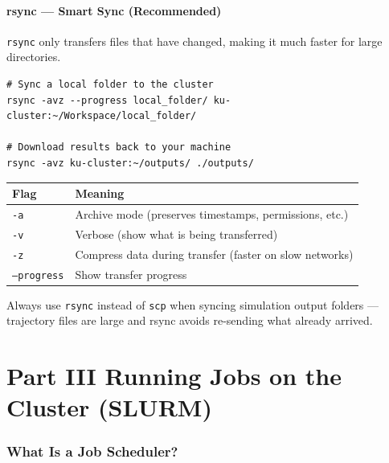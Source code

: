 \documentclass[12pt,a4paper]{article}
\newcommand{\tip}[1]{%
  \begin{tcolorbox}[tipstyle]
    #1
  \end{tcolorbox}
}
\newcommand{\cmd}[1]{\texttt{\textcolor{kugreen!70!black}{#1}}}
\begin{document}
\subsection{rsync --- Smart Sync (Recommended)}

\cmd{rsync} only transfers files that have changed, making it much faster
for large directories.

\begin{lstlisting}[style=bash]
# Sync a local folder to the cluster
rsync -avz --progress local_folder/ ku-cluster:~/Workspace/local_folder/

# Download results back to your machine
rsync -avz ku-cluster:~/outputs/ ./outputs/
\end{lstlisting}

\begin{center}
\begin{tabular}{ll}
\toprule
\textbf{Flag} & \textbf{Meaning} \\
\midrule
\texttt{-a} & Archive mode (preserves timestamps, permissions, etc.) \\
\texttt{-v} & Verbose (show what is being transferred) \\
\texttt{-z} & Compress data during transfer (faster on slow networks) \\
\texttt{--progress} & Show transfer progress \\
\bottomrule
\end{tabular}
\end{center}

\tip{
  Always use \cmd{rsync} instead of \cmd{scp} when syncing simulation output
  folders --- trajectory files are large and rsync avoids re-sending what
  already arrived.
}

\clearpage
\part*{Part III \quad Running Jobs on the Cluster (SLURM)}
\label{sec:slurm}

\section{What Is a Job Scheduler?}
\end{document}
